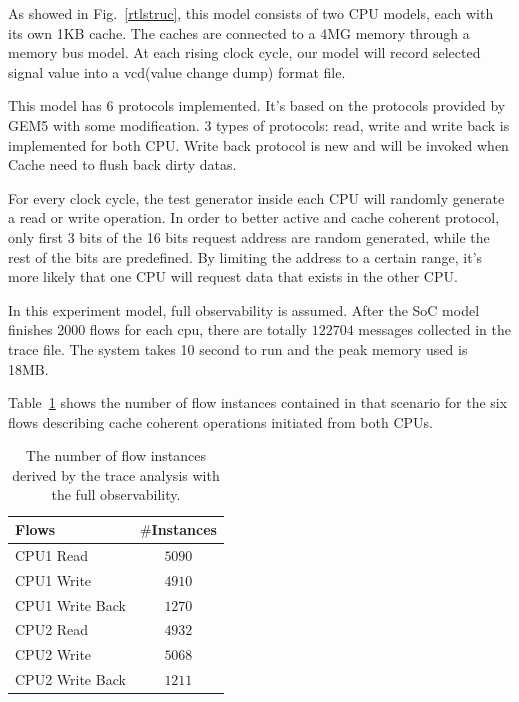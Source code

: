 \documentclass[12pt,frontmatter,copyright,thesis]{usfmanus}
\begin{document}
 As showed in Fig.~\ref{rtlstruc}, this model consists of two CPU models, each with its own 1KB cache. The caches are connected to a 4MG memory through a memory bus model. At each rising clock cycle, our model will record selected signal value into a vcd(value change dump) format file.

This model has 6 protocols implemented. It's based on the protocols provided by GEM5 with some modification. 3 types of protocols: read, write and write back is implemented for both CPU. Write back protocol is new and will be invoked when Cache need to flush back dirty datas.

For every clock cycle, the test generator inside each CPU will randomly generate a read or write operation. In order to better active and cache coherent protocol, only first 3 bits of the 16 bits request address are random generated, while the rest of the bits are predefined. By limiting the address to a certain range, it's more likely that one CPU will request data that exists in the other CPU.

In this experiment model, full observability is assumed.
After the SoC model finishes 2000 flows for each cpu, there
are totally $122704$ messages collected in the trace file.
The system takes 10 second to run and the peak memory used is 18MB.

Table~\ref{table-case-3} shows the number of flow instances contained in that
scenario for the six 
flows describing cache coherent operations initiated from both CPUs.
\begin{table}[tb]
\caption{The number of flow instances derived by the trace analysis with the full observability.}
\begin{center}
\begin{tabular}{|l|c|}
\hline
Flows & $\#$Instances \\
\hline
\hline
CPU1 Read			&  $5090$\\
CPU1 Write				&  $4910$\\
CPU1 Write Back				&  $1270$\\

\hline
CPU2 Read			&  $4932$\\
CPU2 Write				&  $5068$\\
CPU2 Write Back				&  $1211$\\
\hline
\end{tabular}
\end{center}
\label{table-case-3}
\end{table}%
\end{document}
